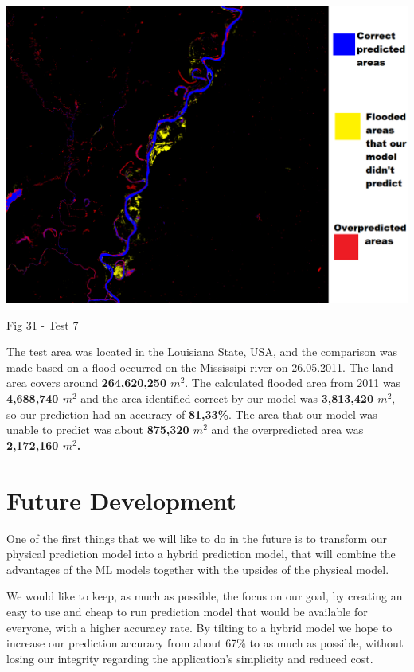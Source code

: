 \documentclass[12pt, a4paper]{report}
\begin{document}
\bigskip
\includegraphics[scale=0.5, center]{test_7.png}
\begin{center}
Fig 31 - Test 7
\end{center}
\par 

The test area was located in the Louisiana State, USA, and the comparison was made based on a flood occurred on the Mississipi river on 26.05.2011. The land area covers around \textbf{264,620,250 $m^2$}. The calculated flooded area from 2011 was \textbf{4,688,740 $m^2$} and the area identified correct by our model was \textbf{3,813,420 $m^2$}, so our prediction had an accuracy of \textbf{81,33\%}. The area that our model was unable to predict was about \textbf{875,320 $m^2$} and the overpredicted area was \textbf{2,172,160 $m^2$.}

\newpage

\section{Future Development}

\quad
One of the first things that we will like to do in the future is to transform our physical prediction model into a hybrid prediction model, that will combine the advantages of the ML models together with the upsides of the physical model.
\par 

We would like to keep, as much as possible, the focus on our goal, by creating an easy to use and cheap to run prediction model that would be available for everyone, with a higher accuracy rate. By tilting to a hybrid model we hope to increase our prediction accuracy from about 67\% to as much as possible, without losing our integrity regarding the application's simplicity and reduced cost.
\par
\end{document}
